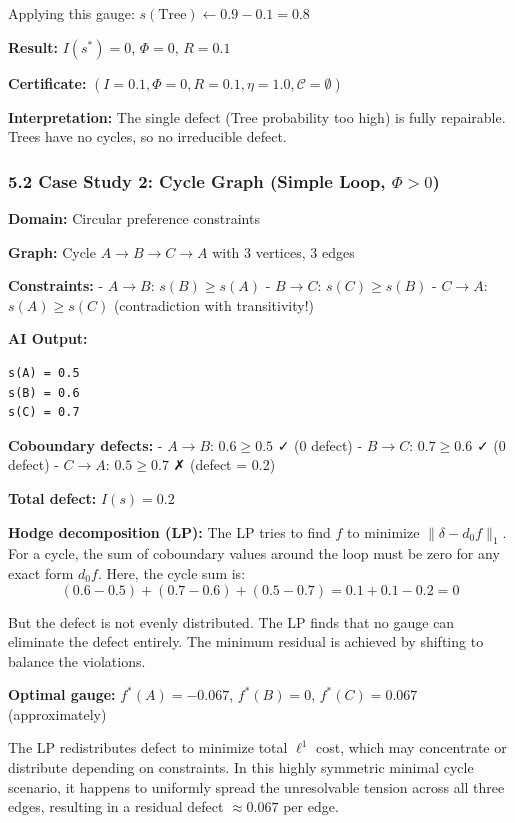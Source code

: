 \documentclass[
]{article}
\begin{document}
Applying this gauge: \(s(\text{Tree}) \gets 0.9 - 0.1 = 0.8\)

\textbf{Result:} \(I(s^*) = 0\), \(\Phi = 0\), \(R = 0.1\)

\textbf{Certificate:}
\((I = 0.1, \Phi = 0, R = 0.1, \eta = 1.0, \mathcal{C} = \emptyset)\)

\textbf{Interpretation:} The single defect (Tree probability too high)
is fully repairable. Trees have no cycles, so no irreducible defect.

\subsubsection{\texorpdfstring{5.2 Case Study 2: Cycle Graph (Simple
Loop,
\(\Phi > 0\))}{5.2 Case Study 2: Cycle Graph (Simple Loop, \textbackslash Phi \textgreater{} 0)}}\label{case-study-2-cycle-graph-simple-loop-phi-0}

\textbf{Domain:} Circular preference constraints

\textbf{Graph:} Cycle \(A \to B \to C \to A\) with 3 vertices, 3 edges

\textbf{Constraints:} - \(A \to B\): \(s(B) \geq s(A)\) - \(B \to C\):
\(s(C) \geq s(B)\) - \(C \to A\): \(s(A) \geq s(C)\) (contradiction with
transitivity!)

\textbf{AI Output:}

\begin{verbatim}
s(A) = 0.5
s(B) = 0.6
s(C) = 0.7
\end{verbatim}

\textbf{Coboundary defects:} - \(A \to B\): \(0.6 \geq 0.5\) ✓ (0
defect) - \(B \to C\): \(0.7 \geq 0.6\) ✓ (0 defect) - \(C \to A\):
\(0.5 \geq 0.7\) ✗ (defect = 0.2)

\textbf{Total defect:} \(I(s) = 0.2\)

\textbf{Hodge decomposition (LP):} The LP tries to find \(f\) to
minimize \(\|\delta - d_0 f\|_1\). For a cycle, the sum of coboundary
values around the loop must be zero for any exact form \(d_0 f\). Here,
the cycle sum is:
\[(0.6 - 0.5) + (0.7 - 0.6) + (0.5 - 0.7) = 0.1 + 0.1 - 0.2 = 0\]

But the defect is not evenly distributed. The LP finds that no gauge can
eliminate the defect entirely. The minimum residual is achieved by
shifting to balance the violations.

\textbf{Optimal gauge:} \(f^*(A) = -0.067\), \(f^*(B) = 0\),
\(f^*(C) = 0.067\) (approximately)

The LP redistributes defect to minimize total \(\ell^1\) cost, which may
concentrate or distribute depending on constraints. In this highly
symmetric minimal cycle scenario, it happens to uniformly spread the
unresolvable tension across all three edges, resulting in a residual
defect \(\approx 0.067\) per edge.
\end{document}
